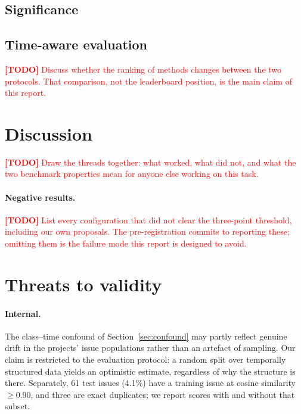 \documentclass[10pt,a4paper]{article}
\newcommand{\todoitem}[1]{\textcolor{red}{\textbf{[TODO]} #1}}
\begin{document}
\subsection{Significance}



\subsection{Time-aware evaluation}
\label{sec:timeaware}



\todoitem{Discuss whether the ranking of methods changes between the two
protocols. That comparison, not the leaderboard position, is the main claim of
this report.}

\section{Discussion}
\label{sec:discussion}

\todoitem{Draw the threads together: what worked, what did not, and what the
two benchmark properties mean for anyone else working on this task.}

\paragraph{Negative results.} \todoitem{List every configuration that did not
clear the three-point threshold, including our own proposals. The
pre-registration commits to reporting these; omitting them is the failure mode
this report is designed to avoid.}

\section{Threats to validity}
\label{sec:threats}

\paragraph{Internal.} The class--time confound of Section~\ref{sec:confound}
may partly reflect genuine drift in the projects' issue populations rather than
an artefact of sampling. Our claim is restricted to the evaluation protocol:
a random split over temporally structured data yields an optimistic estimate,
regardless of why the structure is there. Separately, 61 test issues (4.1\%)
have a training issue at cosine similarity $\geq 0.90$, and three are exact
duplicates; we report scores with and without that subset.
\end{document}
